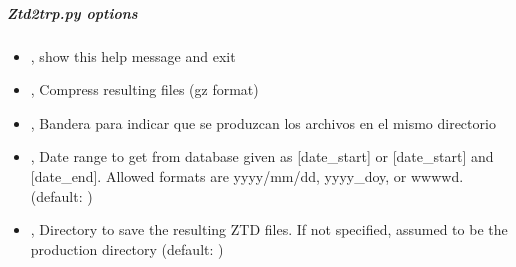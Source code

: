 \documentclass[letterpaper,10pt,english]{sphinxmanual}
\begin{document}
\subparagraph{Ztd2trp.py options}
\label{\detokenize{pgamit.com:Ztd2trp.py-options}}\begin{itemize}
\item {} 
\sphinxAtStartPar
{\hyperref[\detokenize{pgamit.com:Ztd2trp.py--h}]{}}, {\hyperref[\detokenize{pgamit.com:Ztd2trp.py---help}]{}} \sphinxhyphen{} show this help message and exit

\item {} 
\sphinxAtStartPar
{\hyperref[\detokenize{pgamit.com:Ztd2trp.py--z}]{}}, {\hyperref[\detokenize{pgamit.com:Ztd2trp.py---compress}]{}} \sphinxhyphen{} Compress resulting files (gz format)

\item {} 
\sphinxAtStartPar
{\hyperref[\detokenize{pgamit.com:Ztd2trp.py--c}]{}}, {\hyperref[\detokenize{pgamit.com:Ztd2trp.py---produce_here}]{}} \sphinxhyphen{} Bandera para indicar que se produzcan los archivos en el mismo directorio

\item {} 
\sphinxAtStartPar
{\hyperref[\detokenize{pgamit.com:Ztd2trp.py--date}]{}} , {\hyperref[\detokenize{pgamit.com:Ztd2trp.py---date_range}]{}}  \sphinxhyphen{} Date range to get from database given as {[}date\_start{]} or {[}date\_start{]} and {[}date\_end{]}. Allowed formats are yyyy/mm/dd, yyyy\_doy, or wwww\sphinxhyphen{}d. (default: )

\item {} 
\sphinxAtStartPar
{\hyperref[\detokenize{pgamit.com:Ztd2trp.py--dir}]{}} , {\hyperref[\detokenize{pgamit.com:Ztd2trp.py---directory}]{}}  \sphinxhyphen{} Directory to save the resulting ZTD files. If not specified, assumed to be the production directory (default: )

\end{itemize}
\end{document}
